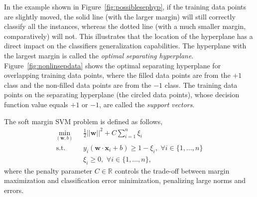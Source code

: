 \documentclass[reqno]{vcuthesis}
\newcommand{\reals}{{\mathbb{R}}}
\numberwithin{equation}{chapter}
\begin{document}
In the example shown in Figure~\ref{fig:possiblesephyp}, if the training data points are slightly moved, the solid line (with the larger margin) will still correctly classify all the instances, whereas the dotted line (with a much smaller margin, comparatively) will not. This illustrates that the location of the hyperplane has a direct impact on the classifiers generalization capabilities. The hyperplane with the largest margin is called the \textit{optimal separating hyperplane}. Figure~\ref{fig:nonlinsepdata} shows the optimal separating hyperplane for overlapping training data points, where the filled data points are from the $+1$ class and the non-filled data points are from the $-1$ class. The training data points on the separating hyperplane (the circled data points), whose decision function value equals $+1$ or $-1$, are called the \textit{support vectors}. 

The soft margin SVM problem is defined as follows,
\begin{equation}
\label{eq:softsvm}
\begin{aligned}
\min\limits_{(\bm{w},b)} &{\,\,\,\,} \frac{1}{2}||\bm{w}||^2 + C\sum_{i=1}^n \xi_i \\
\text{s.t.} & {\,\,\,\,} y_i\left( \bm{w} \cdot \bm{x}_i + b\right) \geq 1 - \xi_i, {\,\,} \forall i \in \{1,\ldots,n\} \\
 & {\,\,\,\,} \xi_i \geq 0, {\,\,} \forall i \in \{1,\ldots,n\},
\end{aligned}
\end{equation}
where the penalty parameter $C \in \reals$ controls the trade-off between margin maximization and classification error minimization, penalizing large norms and errors. 
\end{document}
